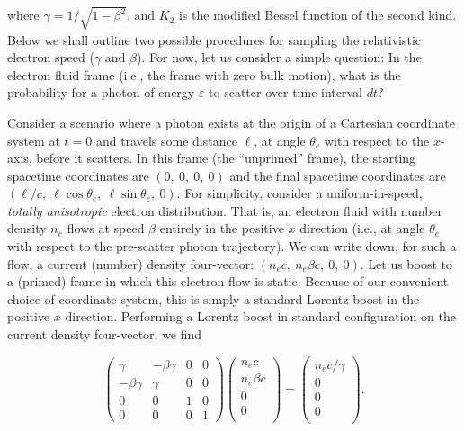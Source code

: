 \documentclass[letterpaper]{article}
\begin{document}
\begin{enumerate}
where $\gamma = 1/\sqrt{1 - \beta^2}$, and $K_2$ is the modified Bessel function of the second kind. Below we shall outline two possible procedures for sampling the relativistic electron speed ($\gamma$ and $\beta$). For now, let us consider a simple question: In the electron fluid frame (i.e., the frame with zero bulk motion), what is the probability for a photon of energy $\varepsilon$ to scatter over time interval $dt$?

Consider a scenario where a photon exists at the origin of a Cartesian coordinate system at $t = 0$ and travels some distance $\ell$, at angle $\theta_e$ with respect to the $x$-axis, before it scatters. In this frame (the ``unprimed'' frame), the starting spacetime coordinates are $(0,\ 0,\ 0,\ 0)$ and the final spacetime coordinates are $(\ell/c,\ \ell \cos \theta_e,\ \ell \sin \theta_e,\ 0)$. For simplicity, consider a uniform-in-speed, \emph{totally anisotropic} electron distribution. That is, an electron fluid with number density $n_e$ flows at speed $\beta$ entirely in the positive $x$ direction (i.e., at angle $\theta_e$ with respect to the pre-scatter photon trajectory). We can write down, for such a flow, a current (number) density four-vector: $(n_e c,\ n_e \beta c,\ 0,\ 0)$. Let us boost to a (primed) frame in which this electron flow is static. Because of our convenient choice of coordinate system, this is simply a standard Lorentz boost in the positive $x$ direction. Performing a Lorentz boost in standard configuration on the current density four-vector, we find

\begin{equation}
\begin{pmatrix}
\gamma & -\beta \gamma & 0 & 0 \\
-\beta \gamma & \gamma & 0 & 0 \\
0 & 0 & 1 & 0 \\
0 & 0 & 0 & 1
\end{pmatrix}
\begin{pmatrix}
n_e c \\
n_e \beta c \\
0 \\
0 \\
\end{pmatrix}
=
\begin{pmatrix}
n_e c / \gamma \\
0 \\
0 \\
0 \\
\end{pmatrix}.
\end{equation}


\end{enumerate}
\end{document}
